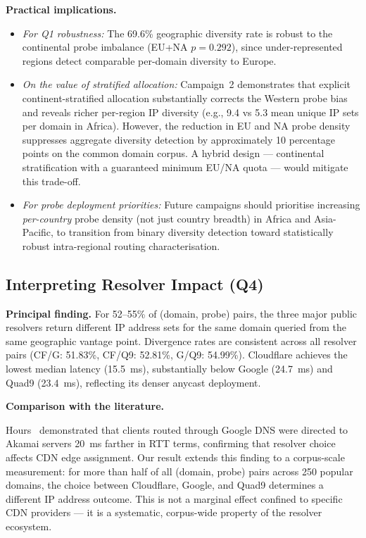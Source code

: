 \textbf{Practical implications.}
\begin{itemize}
  \item \textit{For Q1 robustness:} The 69.6\% geographic diversity rate is robust to the continental probe imbalance (EU+NA $p = 0.292$), since under-represented regions detect comparable per-domain diversity to Europe.
  \item \textit{On the value of stratified allocation:} Campaign~2 demonstrates that explicit continent-stratified allocation substantially corrects the Western probe bias and reveals richer per-region \ac{IP} diversity (e.g., 9.4 vs 5.3 mean unique \ac{IP} sets per domain in Africa). However, the reduction in EU and NA probe density suppresses aggregate diversity detection by approximately 10 percentage points on the common domain corpus. A hybrid design --- continental stratification with a guaranteed minimum EU/NA quota --- would mitigate this trade-off.
  \item \textit{For probe deployment priorities:} Future campaigns should prioritise increasing \emph{per-country} probe density (not just country breadth) in Africa and Asia-Pacific, to transition from binary diversity detection toward statistically robust intra-regional routing characterisation.
\end{itemize}

\bigskip
\subsection{Interpreting Resolver Impact (Q4)}
\label{subsec:5.1.4}

\textbf{Principal finding.} For 52--55\% of (domain, probe) pairs, the three major public resolvers return different \ac{IP} address sets for the same domain queried from the same geographic vantage point. Divergence rates are consistent across all resolver pairs (CF/G: 51.83\%, CF/Q9: 52.81\%, G/Q9: 54.99\%). Cloudflare achieves the lowest median latency (15.5~ms), substantially below Google (24.7~ms) and Quad9 (23.4~ms), reflecting its denser anycast deployment.

\textbf{Comparison with the literature.}

Hours~\cite{Hours2016} demonstrated that clients routed through Google \ac{DNS} were directed to Akamai servers 20~ms farther in \ac{RTT} terms, confirming that resolver choice affects \ac{CDN} edge assignment. Our result extends this finding to a corpus-scale measurement: for more than half of all (domain, probe) pairs across 250 popular domains, the choice between Cloudflare, Google, and Quad9 determines a different \ac{IP} address outcome. This is not a marginal effect confined to specific \ac{CDN} providers --- it is a systematic, corpus-wide property of the resolver ecosystem.

